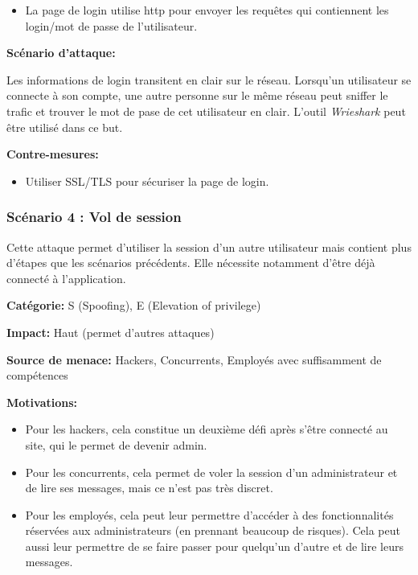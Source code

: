 \documentclass{article}
\begin{document}
\begin{itemize}
\tightlist
\item
  La page de login utilise http pour envoyer les requêtes qui
  contiennent les login/mot de passe de l'utilisateur.
\end{itemize}

\textbf{Scénario d'attaque:}

Les informations de login transitent en clair sur le réseau. Lorsqu'un
utilisateur se connecte à son compte, une autre personne sur le même
réseau peut sniffer le trafic et trouver le mot de pase de cet
utilisateur en clair. L'outil \emph{Wrieshark} peut être utilisé dans ce
but.

\textbf{Contre-mesures:}

\begin{itemize}
\tightlist
\item
  Utiliser SSL/TLS pour sécuriser la page de login.
\end{itemize}

\hypertarget{scuxe9nario-4-vol-de-session}{%
\subsubsection{Scénario 4 : Vol de
session}\label{scuxe9nario-4-vol-de-session}}

Cette attaque permet d'utiliser la session d'un autre utilisateur mais
contient plus d'étapes que les scénarios précédents. Elle nécessite
notamment d'être déjà connecté à l'application.

\textbf{Catégorie:} S (Spoofing), E (Elevation of privilege)

\textbf{Impact:} Haut (permet d'autres attaques)

\textbf{Source de menace:} Hackers, Concurrents, Employés avec
suffisamment de compétences

\textbf{Motivations:}

\begin{itemize}
\tightlist
\item
  Pour les hackers, cela constitue un deuxième défi après s'être
  connecté au site, qui le permet de devenir admin.
\item
  Pour les concurrents, cela permet de voler la session d'un
  administrateur et de lire ses messages, mais ce n'est pas très
  discret.
\item
  Pour les employés, cela peut leur permettre d'accéder à des
  fonctionnalités réservées aux administrateurs (en prennant beaucoup de
  risques). Cela peut aussi leur permettre de se faire passer pour
  quelqu'un d'autre et de lire leurs messages.
\end{itemize}
\end{document}
